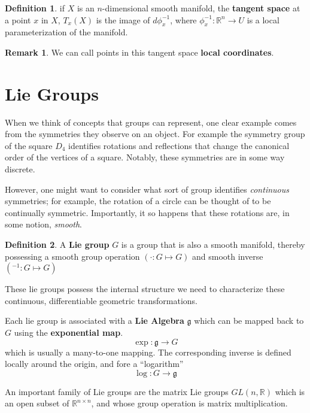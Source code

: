 \documentclass[reqno]{amsart}
\theoremstyle{definition}
\newtheorem{defn}{Definition}[section]
\newtheorem{rem}{Remark}[section]
\numberwithin{equation}{section}
\begin{document}
\begin{defn}
    if $X$ is an $n$-dimensional smooth manifold, the \textbf{tangent space} at a point $x$ in $X$, $T_x(X)$ is the image of $d\phi^{-1}_x$, where $\phi^{-1}_x : \mathbb{R}^n \to U$ is a local parameterization of the manifold.
\end{defn}

\begin{rem}
    We can call points in this tangent space \textbf{local coordinates}.
\end{rem}

\section{Lie Groups}

When we think of concepts that groups can represent, one clear example comes from the symmetries they observe on an object. For example the symmetry group of the square $D_4$ identifies rotations and reflections that change the canonical order of the vertices of a square. Notably, these symmetries are in some way discrete.

However, one might want to consider what sort of group identifies \textit{continuous} symmetries; for example, the rotation of a circle can be thought of to be continually symmetric. Importantly, it so happens that these rotations are, in some notion, \textit{smooth}.

\begin{defn}
    A \textbf{Lie group} $G$ is a group that is also a smooth manifold, thereby possessing a smooth group operation $(\cdot : G \mapsto G)$ and smooth inverse $(^{-1} : G \mapsto G)$
\end{defn}

These lie groups possess the internal structure we need to characterize these continuous, differentiable geometric transformations.

Each lie group is associated with a \textbf{Lie Algebra} $\mathfrak{g}$ which can be mapped back to $G$ using the \textbf{exponential map}.
\begin{equation*}
    \exp : \mathfrak{g} \to G 
\end{equation*}
which is usually a many-to-one mapping. The corresponding inverse is defined locally around the origin, and fore a ``logarithm''
\begin{equation*}
    \log : G \to \mathfrak{g}
\end{equation*}

An important family of Lie groups are the matrix Lie groups $GL(n, \mathbb{R})$ which is an open subset of $\mathbb{R}^{n \times n}$, and whose group operation is matrix multiplication.
\end{document}
